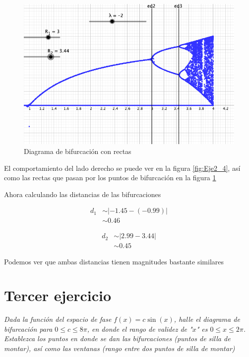 \documentclass[11pt]{report}
\theoremstyle{plain}
\theoremstyle{definition}
\begin{document}
\begin{figure}[!h] %
	\centering
	\includegraphics[scale=0.3]{caos_2_5.png}
	\caption{Diagrama de bifurcación con rectas}
	\label{fig:Eje2_5}
\end{figure}


El comportamiento del lado derecho se puede ver en la figura \ref{fig:Eje2_4}, así como las rectas que pasan por los puntos de bifurcación en la figura \ref{fig:Eje2_5}


Ahora calculando las distancias de las bifurcaciones 

\begin{align*}
	d_1 &\sim |-1.45-(-0.99)|\\
	&\sim 0.46
\end{align*}

\begin{align*}
	d_2 &\sim |2.99-3.44|\\
	&\sim 0.45
\end{align*}

Podemos ver que ambas distancias tienen magnitudes bastante similares
\section{Tercer ejercicio}
\textit{Dada la función del espacio de fase $f(x) = c\sin(x)$, halle el diagrama de bifurcación para $0\leq c \leq 8\pi$, en donde el rango de validez de "$x$" es $0\leq x \leq 2\pi$. Establezca los puntos en donde se dan las bifurcaciones (puntos de silla de montar), así como las ventanas (rango entre dos puntos de silla de montar)}
\end{document}
